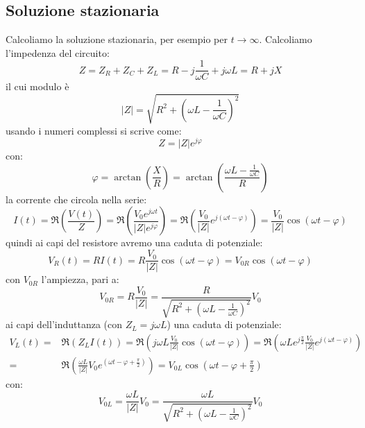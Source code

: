 \subsection{Soluzione stazionaria}
Calcoliamo la soluzione stazionaria, per esempio per $t\to\infty$. Calcoliamo l'impedenza del circuito:
\begin{equation}
Z=Z_R+Z_C+Z_L=R-j\frac{1}{\omega C}+j\omega L=R+j X
\end{equation}
il cui modulo è 
\begin{equation}
|Z|=\sqrt{R^2+\left(\omega L-\frac{1}{\omega C}\right)^2}
\end{equation}
usando i numeri complessi si scrive come:
\begin{equation}
Z=|Z|e^{j\varphi}
\end{equation}
con:
\begin{equation}
\varphi=\arctan\left(\frac{X}{R}\right)=\arctan\left(\frac{\omega L-\frac{1}{\omega C}}{R}\right)
\end{equation}
la corrente che circola nella serie:
\begin{equation}
I(t)=\Re\left({\frac{V(t)}{Z}}\right)=\Re\left({\frac{V_0e^{j\omega t}}{|Z|e^{j\varphi}}}\right)=\Re\left({\frac{V_0}{|Z|}e^{j(\omega t-\varphi)}}\right)=\frac{V_0}{|Z|}\cos(\omega t-\varphi)
\end{equation}
quindi ai capi del resistore avremo una caduta di potenziale:
\begin{equation}
V_R(t)=RI(t)=R\frac{V_0}{|Z|}\cos(\omega t-\varphi)=V_{0R}\cos(\omega t-\varphi)
\end{equation}
con $V_{0R}$ l'ampiezza, pari a:
\begin{equation}
V_{0R}=R\frac{V_0}{|Z|}=\frac{R}{\sqrt{R^2+\left(\omega L-\frac{1}{\omega C}\right)^2}}V_0
\end{equation}
ai capi dell'induttanza (con $Z_L=j\omega L$) una caduta di potenziale:
\begin{equation}
\begin{split}
V_L(t)=&\Re\left(Z_LI(t)\right)=\Re\left(j\omega L\frac{V_0}{|Z|}\cos(\omega t-\varphi)\right)=\Re\left(\omega Le^{j\frac{\pi}{2}}\frac{V_0}{|Z|}e^{j(\omega t-\varphi)}\right)\\
=&\Re\left(\frac{\omega L}{|Z|}V_0e^{\left(\omega t-\varphi+\frac{\pi}{2}\right)}\right)=V_{0L}\cos\left(\omega t-\varphi+\frac{\pi}{2}\right)
\end{split}
\end{equation}
con:
\begin{equation}
V_{0L}=\frac{\omega L}{|Z|}V_0=\frac{\omega L}{\sqrt{R^2+\left(\omega L-\frac{1}{\omega C}\right)^2}}V_0
\end{equation}
